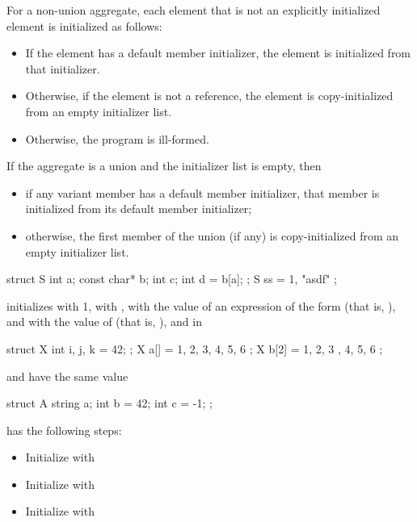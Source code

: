 \pnum
For a non-union aggregate,
each element that is not an explicitly initialized element
is initialized as follows:
\begin{itemize}
\item
If the element has a default member initializer,
the element is initialized from that initializer.
\item
Otherwise, if the element is not a reference, the element
is copy-initialized from an empty initializer list.
\item
Otherwise, the program is ill-formed.
\end{itemize}
If the aggregate is a union and the initializer list is empty, then
\begin{itemize}
\item
if any variant member has a default member initializer,
that member is initialized from its default member initializer;
\item
otherwise, the first member of the union (if any)
is copy-initialized from an empty initializer list.
\end{itemize}
\begin{example}

\begin{codeblock}
struct S { int a; const char* b; int c; int d = b[a]; };
S ss = { 1, "asdf" };
\end{codeblock}

initializes
with 1,
with ,
with the value of an expression of the form
(that is, ), and  with the value of 
(that is, ), and in

\begin{codeblock}
struct X { int i, j, k = 42; };
X a[] = { 1, 2, 3, 4, 5, 6 };
X b[2] = { { 1, 2, 3 }, { 4, 5, 6 } };
\end{codeblock}

 and  have the same value

\begin{codeblock}
struct A {
  string a;
  int b = 42;
  int c = -1;
};
\end{codeblock}

 has the following steps:
\begin{itemize}
\item Initialize  with \tcode{\{\}}
\item Initialize  with 
\item Initialize  with 
\end{itemize}
\end{example}

